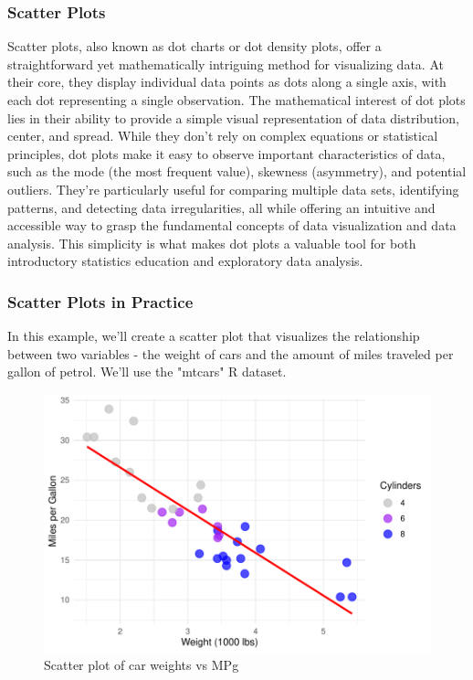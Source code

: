 \documentclass{article}\usepackage[]{graphicx}\usepackage[]{xcolor}
\makeatletter
\def\maxwidth{ %
  \ifdim\Gin@nat@width>\linewidth
    \linewidth
  \else
    \Gin@nat@width
  \fi
}
\newenvironment{kframe}{%
 \def\at@end@of@kframe{}%
 \ifinner\ifhmode%
  \def\at@end@of@kframe{\end{minipage}}%
  \begin{minipage}{\columnwidth}%
 \fi\fi%
 \def\FrameCommand##1{\hskip\@totalleftmargin \hskip-\fboxsep
 \colorbox{shadecolor}{##1}\hskip-\fboxsep
     \hskip-\linewidth \hskip-\@totalleftmargin \hskip\columnwidth}%
 \MakeFramed {\advance\hsize-\width
   \@totalleftmargin\z@ \linewidth\hsize
   \@setminipage}}%
 {\par\unskip\endMakeFramed%
 \at@end@of@kframe}
\newenvironment{knitrout}{}{} %
\makeatother
\begin{document}
\subsubsection{Scatter Plots}
Scatter plots, also known as dot charts or dot density plots, offer a straightforward yet mathematically intriguing method for visualizing data. At their core, they display individual data points as dots along a single axis, with each dot representing a single observation. The mathematical interest of dot plots lies in their ability to provide a simple visual representation of data distribution, center, and spread. While they don't rely on complex equations or statistical principles, dot plots make it easy to observe important characteristics of data, such as the mode (the most frequent value), skewness (asymmetry), and potential outliers. They're particularly useful for comparing multiple data sets, identifying patterns, and detecting data irregularities, all while offering an intuitive and accessible way to grasp the fundamental concepts of data visualization and data analysis. This simplicity is what makes dot plots a valuable tool for both introductory statistics education and exploratory data analysis.

\subsubsection{Scatter Plots in Practice}
In this example, we'll create a scatter plot that visualizes the relationship between two variables - the weight of cars and the amount of miles traveled per gallon of petrol. We'll use the "mtcars" R dataset.

\begin{knitrout}
\color{fgcolor}\begin{kframe}


{\ttfamily\noindent\itshape{}}\end{kframe}\begin{figure}
\includegraphics[width=\maxwidth]{figure/scatter-plot-chunk-1} \caption[Scatter plot of car weights vs MPg]{Scatter plot of car weights vs MPg}\label{fig:scatter-plot-chunk}
\end{figure}

\end{knitrout}
\end{document}
